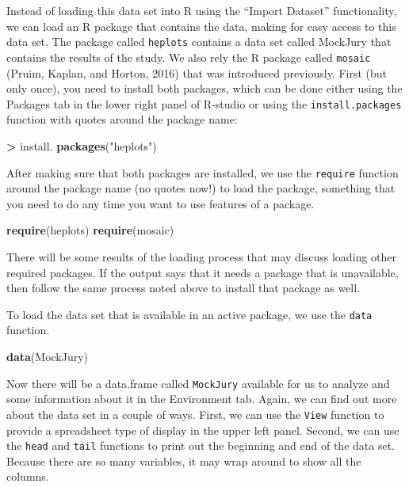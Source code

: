 \documentclass[]{book}
\newenvironment{Shaded}{\begin{snugshade}}{\end{snugshade}}
\newcommand{\KeywordTok}[1]{\textcolor[rgb]{0.13,0.29,0.53}{\textbf{#1}}}
\newcommand{\StringTok}[1]{\textcolor[rgb]{0.31,0.60,0.02}{#1}}
\newcommand{\OperatorTok}[1]{\textcolor[rgb]{0.81,0.36,0.00}{\textbf{#1}}}
\newcommand{\NormalTok}[1]{#1}
\begin{document}
Instead of loading this data set into R using the ``Import Dataset''
functionality, we can load an R package that contains the data, making
for easy access to this data set. The package called \texttt{heplots}
contains a data set called MockJury that contains the results of the
study. We also rely the R package called \texttt{mosaic} (Pruim, Kaplan,
and Horton, 2016) that was introduced previously. First (but only once),
you need to install both packages, which can be done either using the
Packages tab in the lower right panel of R-studio or using the
\texttt{install.packages} function with quotes around the package name:

\begin{Shaded}
\begin{Highlighting}[]
\OperatorTok{>}\StringTok{ }\NormalTok{install. }\KeywordTok{packages}\NormalTok{(}\StringTok{"heplots"}\NormalTok{)}
\end{Highlighting}
\end{Shaded}

After making sure that both packages are installed, we use the
\texttt{require} function around the package name (no quotes now!) to
load the package, something that you need to do any time you want to use
features of a package.

\begin{Shaded}
\begin{Highlighting}[]
\KeywordTok{require}\NormalTok{(heplots)}
\KeywordTok{require}\NormalTok{(mosaic)}
\end{Highlighting}
\end{Shaded}

There will be some results of the loading process that may discuss
loading other required packages. If the output says that it needs a
package that is unavailable, then follow the same process noted above to
install that package as well.

To load the data set that is available in an active package, we use the
\texttt{data} function.

\begin{Shaded}
\begin{Highlighting}[]
\KeywordTok{data}\NormalTok{(MockJury)}
\end{Highlighting}
\end{Shaded}

Now there will be a data.frame called \texttt{MockJury} available for us
to analyze and some information about it in the Environment tab. Again,
we can find out more about the data set in a couple of ways. First, we
can use the \texttt{View} function to provide a spreadsheet type of
display in the upper left panel. Second, we can use the \texttt{head}
and \texttt{tail} functions to print out the beginning and end of the
data set. Because there are so many variables, it may wrap around to
show all the columns.
\end{document}
